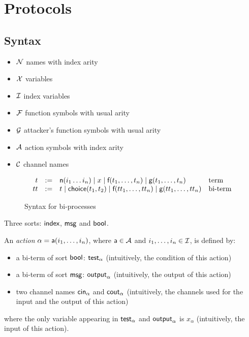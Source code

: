 \section{Protocols}

\subsection{Syntax}

\begin{itemize}
  \item $\mathcal{N}$ names with index arity
  \item $\mathcal{X}$ variables
  \item $\mathcal{I}$ index variables
  \item $\mathcal{F}$ function symbols with usual arity
  \item $\mathcal{G}$ attacker's function symbols with usual arity
  \item $\mathcal{A}$ action symbols with index arity
  \item $\mathcal{C}$ channel names
\end{itemize}

\begin{figure}[h]
  \[
    \begin{array}{rcll}
      t & := & \textsf{n}(i_1 \dots i_n) \mid x \mid \textsf{f}(t_1,\dots,t_n) \mid \textsf{g}(t_1,\dots,t_n) & \text{term}
      \\
      tt & := & t \mid \mathsf{choice}(t_1,t_2) \mid \textsf{f}(tt_1,\dots,tt_n) \mid \textsf{g}(tt_1,\dots,tt_n) & \text{bi-term}
    \end{array}
  \]
  \caption{Syntax for bi-processes}
  \label{fig:syntax-bi-process}
\end{figure}

Three sorts: $\textsf{index}$, $\textsf{msg}$ and $\textsf{bool}$.


\begin{definition}
An \emph{action} $\alpha = \textsf{a}(i_1,\dots,i_n)$, where $\textsf{a} \in \mathcal{A}$ and $i_1,\dots,i_n \in \mathcal{I}$, is defined by:
\begin{itemize}
  \item a bi-term of sort $\textsf{bool}$: $\textsf{test}_{\alpha}$ (intuitively, the condition of this action)
  \item a bi-term of sort $\textsf{msg}$: $\textsf{output}_{\alpha}$ (intuitively, the output of this action)
  \item two channel names $\mathsf{cin}_\alpha$ and $\mathsf{cout}_\alpha$ (intuitively, the channels used for the input and the output of this action)
\end{itemize}
where the only variable appearing in $\textsf{test}_{\alpha}$ and $\textsf{output}_{\alpha}$ is $x_{\alpha}$ (intuitively, the input of this action).
\end{definition}

